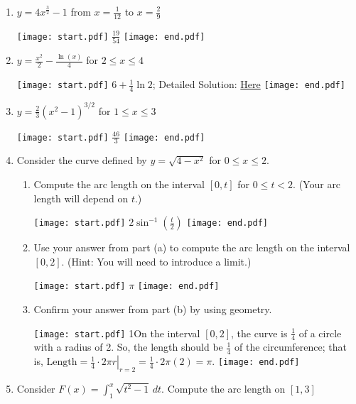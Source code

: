 \documentclass[12pt]{article}
\begin{document}
\begin{enumerate}

\item $y=4x^{\frac{3}{2}}-1$ from $x=\frac{1}{12}$ to $x=\frac{2}{9}$ 

\texttt{[image: start.pdf]}
{{$\frac{19}{54}$}}
\texttt{[image: end.pdf]}


\item $y = \frac{x^2}{2} - \frac{\ln(x)}{4}$ for $2 \leq x \leq 4$ 

\texttt{[image: start.pdf]}
{{$6+\frac{1}{4}\ln{2}$; Detailed Solution: \textcolor{blue}{\href{http://www.math.drexel.edu/classes/Calculus/resources/Math122HW/Solutions/122_09_Arc_Length_02.pdf}{Here}}}}
\texttt{[image: end.pdf]}


\item $y=\frac{2}{3}(x^2-1)^{3/2}$ for $1\leq x \leq 3$ 

\texttt{[image: start.pdf]}
{{$\frac{46}{3}$}}
\texttt{[image: end.pdf]}


\item Consider the curve defined by $y = \sqrt{4-x^2}$ for $0 \leq x \leq 2$.

\begin{enumerate}

\item Compute the arc length on the interval $[0,t]$ for $0 \leq t <2$. (Your arc length will depend on $t$.)

\texttt{[image: start.pdf]}
{{$2\sin^{-1}{\left(\frac{t}{2}\right)}$}}
\texttt{[image: end.pdf]}


\item Use your answer from part (a) to compute the arc length on the interval $[0,2]$. (Hint: You will need to introduce a limit.)

\texttt{[image: start.pdf]}
{{$\pi$}}
\texttt{[image: end.pdf]}


\item Confirm your answer from part (b) by using geometry.

\texttt{[image: start.pdf]}
{{{1\linewidth}{On the interval $[0,2]$, the curve is $\frac{1}{4}$ of a circle with a radius of 2.  So, the length should be $\frac{1}{4}$  of the circumference; that is, $\text{Length} = \left.\frac{1}{4} \cdot 2 \pi r \right|_{r=2}= \frac{1}{4} \cdot 2 \pi (2) = \pi$.}}}
\texttt{[image: end.pdf]}


\end{enumerate}

\item Consider $F(x)=\int_1^x \sqrt{t^2-1} \,dt$.  Compute the arc length on $[1,3]$


\end{enumerate}
\end{document}
